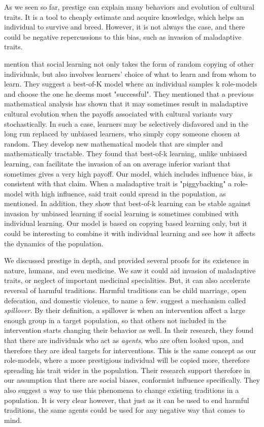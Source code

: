 \documentclass[12pt]{extarticle}
\begin{document}
As we seen so far, prestige can explain many behaviors and evolution of cultural traits. It is a tool to cheaply estimate and acquire knowledge, which helps an individual to survive and breed. However, it is not always the case, and there could be negative repercussions to this bias, such as invasion of maladaptive traits.

\citet{best_of_k} mention that social learning not only takes the form of random copying of other individuals, but also involves learners’ choice of what to learn and from whom to learn. They suggest a best-of-K model where an individual samples k role-models and choose the one he deems most "successful". They mentioned that a previous mathematical analysis has shown that it may sometimes result in maladaptive cultural evolution when the payoffs associated with cultural variants vary stochastically. In such a case, learners may be selectively disfavored and in the long run replaced by unbiased learners, who simply copy someone chosen at random. They develop new mathematical models that are simpler and mathematically tractable. They found that best-of-k learning, unlike unbiased learning, can facilitate the invasion of an on average inferior variant that sometimes gives a very high payoff. Our model, which includes influence bias, is consistent with that claim. When a maladaptive trait is "piggybacking" a role-model with high influence, said trait could spread in the population, as mentioned. In addition, they show that best-of-k learning can be stable against invasion by unbiased learning if social learning is sometimes combined with individual learning. Our model is based on copying based learning only, but it could be interesting to combine it with individual learning and see how it affects the dynamics of the population.

We discussed prestige in depth, and provided several proofs for its existence in nature, humans, and even medicine. We saw it could aid invasion of maladaptive traits, or neglect of important medicinal specialities. But, it can also accelerate reversal of harmful traditions.
Harmful traditions can be child marriage, open defecation, and domestic violence, to name a few. 
\citet{harmful_traditions} suggest a mechanism called \textit{spillover}. By their definition, a spillover is when an intervention affect a large enough group in a target population, so that others not included in the intervention starts changing their behavior as well. In their research, they found that there are individuals who act as \textit{agents}, who are often looked upon, and therefore they are ideal targets for interventions. This is the same concept as our role-models, where a more prestigious individual will be copied more, therefore spreading his trait wider in the population. Their research support therefore in our assumption that there are social biases, conformist influence specifically. They also suggest a way to use this phenomena to change existing traditions in a population. It is very clear however, that just as it can be used to end harmful traditions, the same agents could be used for any negative way that comes to mind.
\end{document}

